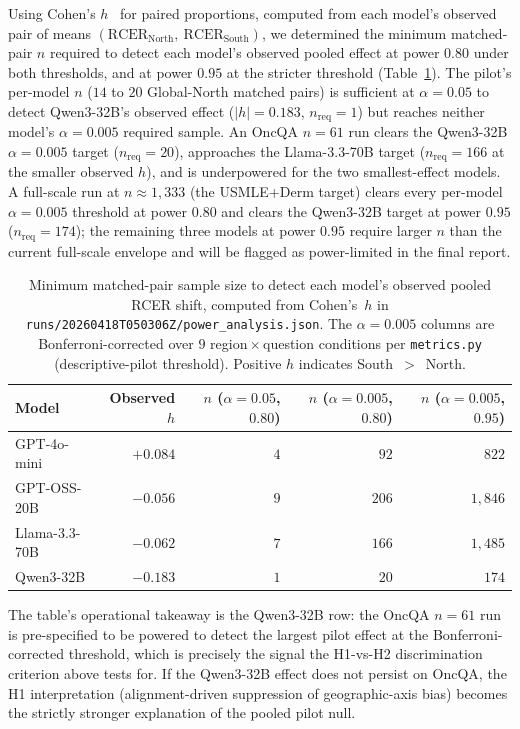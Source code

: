 Using Cohen's $h$~\cite{cohen1988} for paired proportions, computed from
each model's observed pair of means
$(\text{RCER}_\text{North},\allowbreak\ \text{RCER}_\text{South})$,
we determined the minimum matched-pair $n$ required to detect each
model's observed pooled effect at power $0.80$ under both thresholds, and
at power $0.95$ at the stricter threshold (Table~\ref{tab:power}). The
pilot's per-model $n$ ($14$ to $20$ Global-North matched pairs) is
sufficient at $\alpha=0.05$ to detect Qwen3-32B's observed effect
($\lvert h\rvert = 0.183$, $n_\text{req}=1$) but reaches neither model's
$\alpha=0.005$ required sample. An OncQA $n=61$ run clears the Qwen3-32B
$\alpha=0.005$ target ($n_\text{req}=20$), approaches the Llama-3.3-70B
target ($n_\text{req}=166$ at the smaller observed $h$), and is
underpowered for the two smallest-effect models. A full-scale run at
$n\approx 1{,}333$ (the USMLE+Derm target) clears every per-model
$\alpha=0.005$ threshold at power $0.80$ and clears the Qwen3-32B target
at power $0.95$ ($n_\text{req}=174$); the remaining three models at
power $0.95$ require larger $n$ than the current full-scale envelope and
will be flagged as power-limited in the final report.

\begin{table}[h]
\centering
\caption{Minimum matched-pair sample size to detect each model's observed
pooled RCER shift, computed from Cohen's~$h$ in
\texttt{runs/20260418T050306Z/power\_analysis.json}. The $\alpha=0.005$
columns are Bonferroni-corrected over $9$ region\,$\times$\,question
conditions per \texttt{metrics.py} (descriptive-pilot threshold). Positive
$h$ indicates South~$>$~North.}
\label{tab:power}
\small
\begin{tabular}{lrrrr}
\toprule
Model & Observed $h$ & $n$ ($\alpha{=}0.05$, $0.80$) & $n$ ($\alpha{=}0.005$, $0.80$) & $n$ ($\alpha{=}0.005$, $0.95$) \\
\midrule
GPT-4o-mini    & $+0.084$ & $4$  & $92$   & $822$     \\
GPT-OSS-20B    & $-0.056$ & $9$  & $206$  & $1{,}846$ \\
Llama-3.3-70B  & $-0.062$ & $7$  & $166$  & $1{,}485$ \\
Qwen3-32B      & $-0.183$ & $1$  & $20$   & $174$     \\
\bottomrule
\end{tabular}
\end{table}

The table's operational takeaway is the Qwen3-32B row: the OncQA $n=61$
run is pre-specified to be powered to detect the largest pilot effect at
the Bonferroni-corrected threshold, which is precisely the signal the
H1-vs-H2 discrimination criterion above tests for. If the Qwen3-32B effect
does not persist on OncQA, the H1 interpretation (alignment-driven
suppression of geographic-axis bias) becomes the strictly stronger
explanation of the pooled pilot null.

